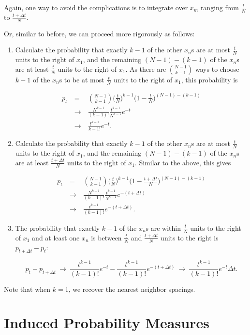 \documentclass[12pt,letterpaper]{report}
\newcommand\be{\begin{equation}}
\newcommand\ee{\end{equation}}
\newcommand\bea{\begin{eqnarray}}
\newcommand\eea{\end{eqnarray}}
\newcommand\ben{\begin{enumerate}}
\newcommand\een{\end{enumerate}}
\newcommand{\ncr}[2]{{#1 \choose #2}}
\begin{document}
Again, one way to avoid the complications is to integrate over
$x_m$ ranging from $\frac{t}{N}$ to $\frac{t+\Delta t}{N}$.

Or, similar to before, we can proceed more rigorously as follows:

\ben
\item Calculate the probability that exactly $k-1$ of the other $x_n$s
are at most $\frac{t}{N}$ units to the right of $x_1$, and the
remaining $(N-1)-(k-1)$ of the $x_n$s are at least $\frac{t}{N}$
units to the right of $x_1$. As there are $\ncr{N-1}{k-1}$ ways to
choose $k-1$ of the $x_n$s to be at most $\frac{t}{N}$ units to
the right of $x_1$, this probability is

\bea p_t & \ = \ & \ncr{N-1}{k-1} \Big( \frac{t}{N} \Big)^{k-1}
\Big(1 - \frac{t}{N} \Big)^{(N-1)-(k-1)} \nonumber\\ & \ \to \ &
\frac{N^{k-1}}{(k-1)!} \frac{t^{k-1}}{N^{k-1}} e^{-t} \nonumber\\
&  \ \to \ & \frac{t^{k-1}}{{k-1}!} e^{-t}. \eea

\item Calculate the probability that exactly $k-1$ of the other $x_n$s
are at most $\frac{t}{N}$ units to the right of $x_1$, and the
remaining $(N-1)-(k-1)$ of the $x_n$s are at least $\frac{t+\Delta
t}{N}$ units to the right of $x_1$. Similar to the above, this
gives

\bea p_t & \ = \ & \ncr{N-1}{k-1} \Big( \frac{t}{N} \Big)^{k-1}
\Big(1 - \frac{t+\Delta t}{N} \Big)^{(N-1)-(k-1)} \nonumber\\ & \
\to \ & \frac{N^{k-1}}{(k-1)!} \frac{t^{k-1}}{N^{k-1}}
e^{-(t+\Delta t)} \nonumber\\ &  \ \to \ & \frac{t^{k-1}}{(k-1)!}
e^{-(t+\Delta t)}. \eea


\item The probability that exactly $k-1$ of the $x_n$s are within
$\frac{t}{N}$ units to the right of $x_1$ and at least one $x_n$
is between $\frac{t}{N}$ and $\frac{t+\Delta t}{N}$ units to the
right is $p_{t+\Delta t} - p_t$:

\be p_t - p_{t+\Delta t}  \ \to \ \frac{t^{k-1}}{(k-1)!} e^{-t} -
\frac{t^{k-1}}{(k-1)!} e^{-(t+\Delta t)} \ \to \
\frac{t^{k-1}}{(k-1)!} e^{-t} \Delta t. \ee

\een

Note that when $k = 1$, we recover the nearest neighbor spacings.

\section{Induced Probability Measures}
\end{document}
